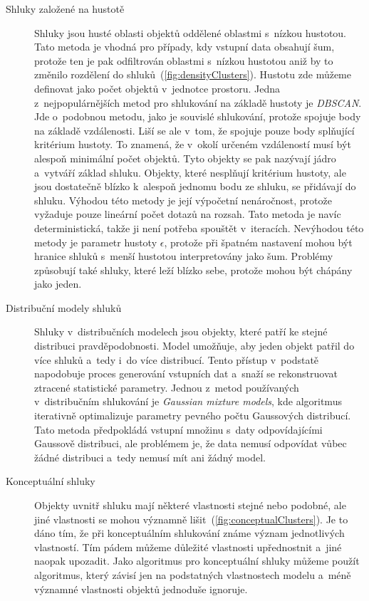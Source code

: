 \begin{description}
\item[Shluky založené na hustotě] Shluky jsou husté oblasti objektů oddělené oblastmi s~nízkou hustotou. Tato metoda je vhodná pro případy, kdy vstupní data obsahují šum, protože ten je pak odfiltrován oblastmi s~nízkou hustotou aniž by to změnilo rozdělení do shluků~(\autoref{fig:densityClusters}). Hustotu zde můžeme definovat jako počet objektů v~jednotce prostoru.
Jedna z~nejpopulárnějších metod pro shlukování na základě hustoty je \textit{DBSCAN}. Jde o~podobnou metodu, jako je souvislé shlukování, protože spojuje body na základě vzdálenosti. Liší se ale v~tom, že spojuje pouze body splňující kritérium hustoty. To znamená, že v~okolí určeném vzdáleností musí být alespoň minimální počet objektů. Tyto objekty se pak nazývají jádro a~vytváří základ shluku. Objekty, které nesplňují kritérium hustoty, ale jsou dostatečně blízko k~alespoň jednomu bodu ze shluku, se přidávají do shluku.
Výhodou této metody je její výpočetní nenáročnost, protože vyžaduje pouze lineární počet dotazů na rozsah. Tato metoda je navíc deterministická, takže ji není potřeba spouštět v~iteracích.
Nevýhodou této metody je parametr hustoty $\epsilon$, protože při špatném nastavení mohou být hranice shluků s~menší hustotou interpretovány jako šum. Problémy způsobují také shluky, které leží blízko sebe, protože mohou být chápány jako jeden.

\item[Distribuční modely shluků] Shluky v~distribučních modelech jsou objekty, kte\-ré patří ke stejné distribuci pravděpodobnosti. Model umožňuje, aby jeden objekt patřil do více shluků a~tedy i~do více distribucí.
Tento přístup v~podstatě napodobuje proces generování vstupních dat a~sna\-ží se rekonstruovat ztracené statistické parametry. %
Jednou z~metod používaných v~distribučním shlukování je \textit {Gaussian mixture models}, kde algoritmus iterativně optimalizuje parametry pevného počtu Gaussových distribucí.
Tato metoda předpokládá vstupní množinu s~daty odpovídajícími Gaussově distribuci, ale problémem je, že data nemusí od\-po\-ví\-dat vůbec žádné distribuci a~tedy nemusí mít ani žádný model.

\item[Konceptuální shluky] Objekty uvnitř shluku mají některé vlastnosti stejné nebo podobné, ale jiné vlastnosti se mohou významně lišit~(\autoref{fig:conceptualClusters}). Je to dáno tím, že při konceptuálním shlukování známe význam jednotlivých vlastností. Tím pádem můžeme důležité vlastnosti upřednostnit a~jiné naopak upozadit.
Jako algoritmus pro konceptuální shluky můžeme použít algoritmus, který závisí jen na podstatných vlastnostech modelu a~méně významné vlastnosti objektů jednoduše ignoruje.


\end{description}
